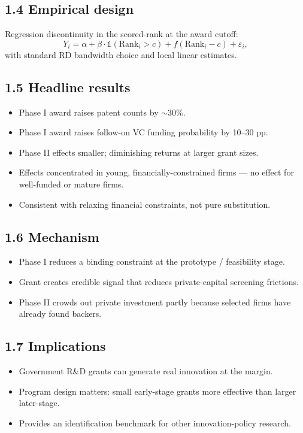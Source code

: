 \documentclass[11pt]{article}
\begin{document}
\subsection*{1.4 Empirical design}
Regression discontinuity in the scored-rank at the award cutoff:
\[
Y_i=\alpha+\beta\cdot\mathbb{1}(\text{Rank}_i>c)+f(\text{Rank}_i-c)+\varepsilon_i,
\]
with standard RD bandwidth choice and local linear estimates.

\subsection*{1.5 Headline results}
\begin{itemize}
\item Phase I award raises patent counts by $\sim$30\%.
\item Phase I award raises follow-on VC funding probability by 10--30 pp.
\item Phase II effects smaller; diminishing returns at larger grant sizes.
\item Effects concentrated in young, financially-constrained firms --- no effect for well-funded or mature firms.
\item Consistent with relaxing financial constraints, not pure substitution.
\end{itemize}

\subsection*{1.6 Mechanism}
\begin{itemize}
\item Phase I reduces a binding constraint at the prototype / feasibility stage.
\item Grant creates credible signal that reduces private-capital screening frictions.
\item Phase II crowds out private investment partly because selected firms have already found backers.
\end{itemize}

\subsection*{1.7 Implications}
\begin{itemize}
\item Government R\&D grants can generate real innovation at the margin.
\item Program design matters: small early-stage grants more effective than larger later-stage.
\item Provides an identification benchmark for other innovation-policy research.
\end{itemize}
\end{document}

